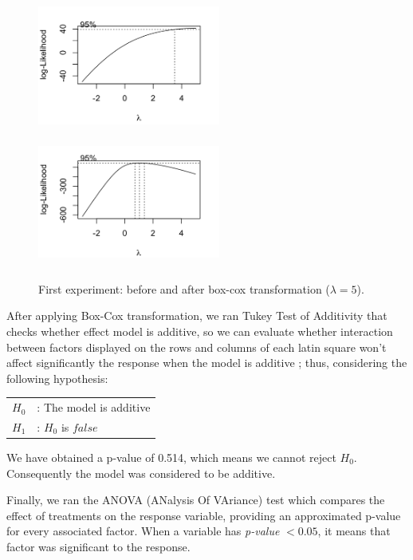 \begin{figure}
\includegraphics[height=4.5cm, width=6cm]{img/u2.png}
\hfill
\includegraphics[height=4.3cm, width=6cm]{img/u2boxcox.png}
\caption{First experiment: before and after box-cox transformation ($\lambda = 5$).}
\end{figure}

After applying Box-Cox transformation, we ran Tukey Test of Additivity that checks whether effect model is additive, so we can evaluate whether interaction between factors displayed on the rows and columns of each latin square won't affect significantly the response when the model is additive \cite{box}; thus, considering the following hypothesis:

\begin{tabular}{ll}
$H_{0}$ & : The model is additive \\
$H_{1}$ & : $H_{0}$ is $false$ \\
\end{tabular}

We have obtained a p-value of 0.514, which means we cannot reject $H_{0}$. Consequently the model was considered to be additive.

Finally, we ran the ANOVA (ANalysis Of VAriance) test which compares the effect of treatments on the response variable, providing an approximated p-value for every associated factor. When a variable has \emph{p-value} $< 0.05$, it means that factor was significant to the response.

